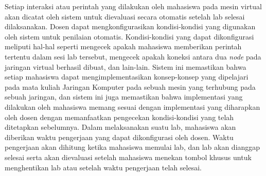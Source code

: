 Setiap interaksi atau perintah yang dilakukan oleh mahasiswa pada mesin virtual akan dicatat oleh sistem untuk dievaluasi secara otomatis setelah lab selesai dilaksanakan.
Dosen dapat mengkonfigurasikan kondisi-kondisi yang digunakan oleh sistem untuk penilaian otomatis. Kondisi-kondisi yang dapat dikonfigurasi meliputi hal-hal seperti mengecek
apakah mahasiswa memberikan perintah tertentu dalam sesi lab tersebut, mengecek apakah koneksi antara dua \textit{node} pada jaringan virtual berhasil dibuat, dan lain-lain. 
Sistem ini memastikan bahwa setiap mahasiswa dapat mengimplementasikan konsep-konsep yang dipelajari pada mata kuliah Jaringan Komputer pada sebuah mesin yang terhubung pada sebuah jaringan,
dan sistem ini juga memastikan bahwa implementasi yang dilakukan oleh mahasiswa memang sesuai dengan implementasi yang diharapkan oleh dosen dengan memanfaatkan pengecekan kondisi-kondisi
yang telah ditetapkan sebelumnya. Dalam melaksanakan suatu lab, mahasiswa akan diberikan waktu pengerjaan yang dapat dikonfigurasi oleh dosen. Waktu pengerjaan akan dihitung ketika mahasiswa
memulai lab, dan lab akan dianggap selesai serta akan dievaluasi setelah mahasiswa menekan tombol khusus untuk menghentikan lab atau setelah waktu pengerjaan telah selesai.
\par





